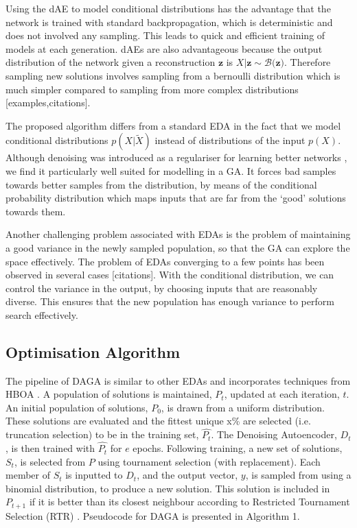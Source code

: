 \documentclass[runningheads,a4paper]{llncs}
\begin{document}
Using the dAE to model conditional distributions has the advantage that the network is trained with standard backpropagation, which is deterministic and does not involved any sampling. This leads to quick and efficient training of models at each generation. dAEs are also advantageous because the output distribution of the network given a reconstruction $ \mathbf z$ is  $X|\mathbf{z} \sim \mathcal{B(\mathbf{z}})$. Therefore sampling new solutions involves sampling from a bernoulli distribution which is much simpler compared to sampling from more complex distributions [examples,citations]. 

The proposed algorithm differs from a standard EDA in the fact that we model conditional distributions $p(X|\tilde X)$ instead of distributions of the input $p(X)$. Although denoising was introduced as a regulariser for learning better networks \cite{vincent2010stacked}, we find it particularly well suited for modelling in a GA. It forces bad samples towards better samples from the distribution, by means of the conditional probability distribution which maps inputs that are far from the `good' solutions towards them.

Another challenging problem associated with EDAs is the problem of maintaining a good variance in the newly sampled population, so that the GA can explore the space effectively. The problem of EDAs converging to a few points has been observed in several cases [citations]. With the conditional distribution, we can control the variance in the output, by choosing inputs that are reasonably diverse. This ensures that the new population has enough variance to perform search effectively. 



\subsection{Optimisation Algorithm}

The pipeline of DAGA is similar to other EDAs and incorporates techniques from HBOA \cite{hboa}. A population of solutions is maintained, \(P_t\), updated at each iteration, \(t\). An initial population of solutions, \(P_0\), is drawn from a uniform distribution. These solutions are evaluated and the fittest unique x\% are selected (i.e. truncation selection) to be in the training set, \(\hat{P_t}\). The Denoising Autoencoder, \(D_t\), is then trained with \(\hat{P_t}\) for \(e\) epochs. Following training, a new set of solutions, \(S_t\), is selected from \(P\) using tournament selection (with replacement). Each member of \(S_t\) is inputted to \(D_t\), and the output vector, \(y\), is sampled from using a binomial distribution, to produce a new solution. This solution is included in \(P_{t+1}\) if it is better than its closest neighbour according to Restricted Tournament Selection (RTR) \cite{hboa}. Pseudocode for DAGA is presented in Algorithm 1.
\end{document}
